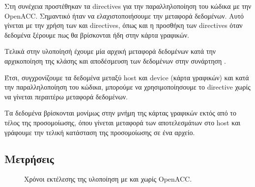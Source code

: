 \documentclass[11pt]{scrartcl} %
\begin{document}
Στη συνέχεια προστέθηκαν τα directives για την παραλληλοποίηση του κώδικα με την OpenACC.
Σημαντικό ήταν να ελαχιστοποιήσουμε την μεταφορά δεδομένων. Αυτό γίνεται με την χρήση των  και  directives,
όπως και η προσθήκη των  directives όταν δεδομένα ξέρουμε πως θα βρίσκονται ήδη στην κάρτα γραφικών.

Τελικά στην υλοποίησή έχουμε μία αρχική μεταφορά δεδομένων 
κατά την αρχικοποίηση της κλάσης  και αποδέσμευση των δεδομένων στην συνάρτηση .





Έτσι, συγχρονίζουμε τα δεδομένα μεταξύ host και device (κάρτα γραφικών) και κατά την παραλληλοποίηση του κώδικα, 
μπορούμε να χρησιμοποίησουμε το  directive χωρίς να γίνεται περαιτέρω μεταφορά δεδομένων.

Τα δεδομένα βρίσκονται μονίμως στην μνήμη της κάρτας γραφικών εκτός από το τέλος της προσομοίωσης, όπου γίνεται μεταφορά των αποτελεσμάτων στο host
και γράφουμε την τελική κατάσταση της προσομοίωσης σε ένα αρχείο.

\subsection{Μετρήσεις}


\begin{figure}[H]
    \begin{center}
    \end{center}
    \caption{Χρόνοι εκτέλεσης της υλοποίηση με και χωρίς OpenACC.}
    \label{fig:acc_times}
\end{figure}
\end{document}
